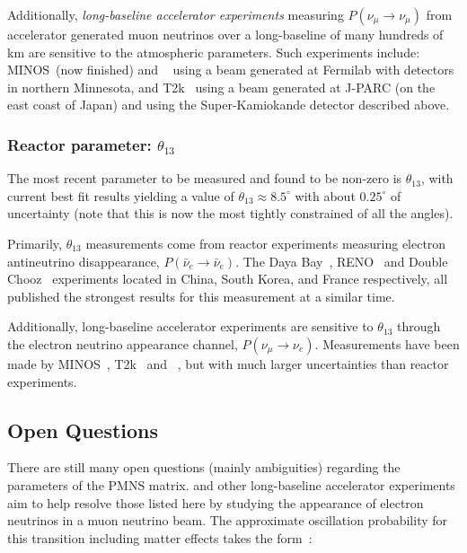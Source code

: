 Additionally, \emph{long-baseline accelerator experiments} measuring
$P(\nu_{\mu}\rightarrow\nu_{\mu})$ from accelerator generated muon neutrinos over a long-baseline
of many hundreds of km are sensitive to the atmospheric parameters. Such experiments include:
MINOS~\cite{adamson2013_1,adamson2013_2}(now finished) and \nova~\cite{acero2019,himmel2020} using
a beam generated at Fermilab with detectors in northern Minnesota, and T2k~\cite{dunne2020} using
a beam generated at J-PARC (on the east coast of Japan) and using the Super-Kamiokande detector
described above.

\subsubsection*{Reactor parameter: $\theta_{13}$} %

The most recent parameter to be measured and found to be non-zero is $\theta_{13}$, with current
best fit results yielding a value of $\theta_{13}\approx8.5^{\circ}$ with about $0.25^{\circ}$ of
uncertainty (note that this is now the most tightly constrained of all the angles).

Primarily, $\theta_{13}$ measurements come from reactor experiments measuring electron
antineutrino disappearance, $P(\bar{\nu}_{e}\rightarrow\bar{\nu}_{e})$. The Daya
Bay~\cite{an2012,an2017}, RENO~\cite{ahn2012,bak2018} and Double Chooz~\cite{abe2012} experiments
located in China, South Korea, and France respectively, all published the strongest results for
this measurement at a similar time.

Additionally, long-baseline accelerator experiments are sensitive to $\theta_{13}$ through the
electron neutrino appearance channel, $P(\nu_{\mu}\rightarrow\nu_{e})$. Measurements have been
made by MINOS~\cite{adamson2013_3}, T2k~\cite{abe2013} and \nova~\cite{adamson2016_2}, but with
much larger uncertainties than reactor experiments.

\subsection{Open Questions} %
\label{sec:theory_status_open} %

There are still many open questions (mainly ambiguities) regarding the parameters of the PMNS
matrix. \chips and other long-baseline accelerator experiments aim to help resolve those listed
here by studying the appearance of electron neutrinos in a muon neutrino beam. The approximate
oscillation probability for this transition including matter effects takes the
form~\cite{particle2020}:

